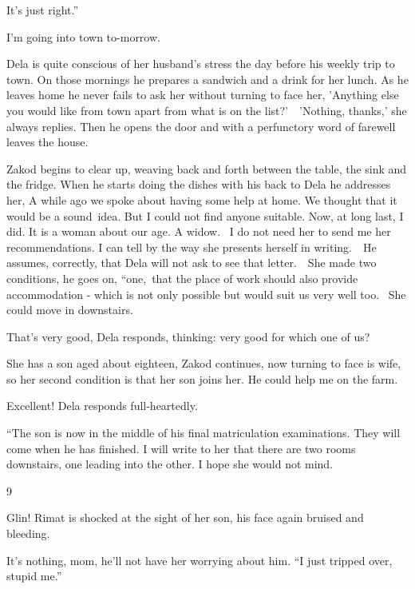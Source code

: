 \documentclass[twoside,11pt]{book}
\begin{document}
{\textquotedbl}It's just right.'' 

{\textquotedbl}I'm going into town to-morrow.{\textquotedbl}\ 

Dela is quite conscious of her husband's stress the day before his weekly trip to town. On those mornings he prepares a
sandwich and a drink for her lunch. As he leaves home he never fails to ask her without turning to face her, 'Anything
else you would like from town apart from what is on the list?'\ \ {}'Nothing, thanks,' she always replies. Then he
opens the door and with a perfunctory word of farewell leaves the house. 

Zakod begins to clear up, weaving back and forth between the table, the sink and the fridge. When he starts doing the
dishes with his back to Dela he addresses her, {\textquotedbl}A while ago we spoke about having some help at home. We
thought that it would be a sound\ idea. But I could not find anyone suitable. Now, at long last, I did. It is a woman
about our age. A widow.~ I do not need her to send me her recommendations. I can tell by the way she presents herself
in writing.{\textquotedbl}\ \ He assumes, correctly, that Dela will not ask to see that letter.\ \ {\textquotedbl}She
made two conditions,{\textquotedbl} he goes on, ``one,~that the place of work should also provide accommodation - which
is not only possible but would suit us very well too.~ She could move in downstairs.{\textquotedbl} 

{\textquotedbl}That's very good,{\textquotedbl} Dela responds, thinking: very good for which one of us? 

{\textquotedbl}She has a son aged about eighteen,{\textquotedbl} Zakod continues, now turning to face is wife,
{\textquotedbl}so her second condition is that her son joins her. He could help me on the farm.{\textquotedbl} 

{\textquotedbl}Excellent!{\textquotedbl} Dela responds full-heartedly.

{}``The son is now in the middle of his final matriculation examinations. They will come when he has finished. I will
write to her that there are two rooms downstairs, one leading into the other. I hope she would not mind.{\textquotedbl}


\bigskip

9

{\textquotedbl}Glin!{\textquotedbl} Rimat is shocked at the sight of her son, his face again bruised and bleeding.

{\textquotedbl}It's nothing, mom,{\textquotedbl} he'll not have her worrying about him. ``I just tripped over, stupid
me.'' 
\end{document}
